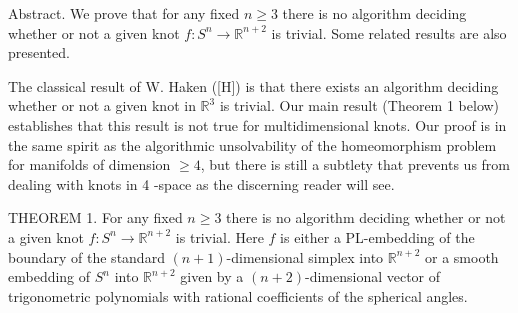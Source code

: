 
Abstract. We prove that for any fixed $n \geq 3$ there is no algorithm deciding whether or not a given knot $f: S^{n} \rightarrow \mathbb{R}^{n+2}$ is trivial. Some related results are also presented.

The classical result of W. Haken ([H]) is that there exists an algorithm deciding whether or not a given knot in $\mathbb{R}^{3}$ is trivial. Our main result (Theorem 1 below) establishes that this result is not true for multidimensional knots. Our proof is in the same spirit as the algorithmic unsolvability of the homeomorphism problem for manifolds of dimension $\geq 4$, but there is still a subtlety that prevents us from dealing with knots in 4 -space as the discerning reader will see.

THEOREM 1. For any fixed $n \geq 3$ there is no algorithm deciding whether or not a given knot $f: S^{n} \rightarrow \mathbb{R}^{n+2}$ is trivial. Here $f$ is either a PL-embedding of the boundary of the standard $(n+1)$-dimensional simplex into $\mathbb{R}^{n+2}$ or a smooth embedding of $S^{n}$ into $\mathbb{R}^{n+2}$ given by a $(n+2)$-dimensional vector of trigonometric polynomials with rational coefficients of the spherical angles.
